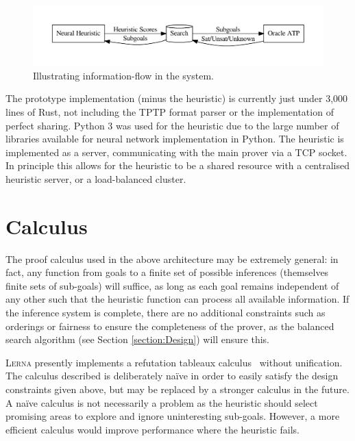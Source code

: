 \documentclass{llncs}
\newcommand{\lerna}{\textsc{Lerna}}
\begin{document}
\begin{figure}[t]
	\centering
	\includegraphics[width=0.8\linewidth]{architecture}
	\caption{Illustrating information-flow in the system.}
	\label{figure:architecture}
\end{figure}


The prototype implementation (minus the heuristic) %
is currently just under 3,000 lines of Rust, not including the TPTP format parser or the implementation of perfect sharing.
Python 3 was used for the heuristic due to the large number of libraries available for neural network implementation in Python.
The heuristic is implemented as a server, communicating with the main prover via a TCP socket.
In principle this allows for the heuristic to be a shared resource with a centralised heuristic server, or a load-balanced cluster.

\section{Calculus}
\label{section:Calculus}
The proof calculus used in the above architecture may be extremely general: in fact, any function from goals to a finite set of possible inferences (themselves finite sets of sub-goals) will suffice, as long as each goal remains independent of any other such that the heuristic function can process all available information.  If the inference system is complete, there are no additional constraints such as orderings or fairness to ensure the completeness of the prover, as the balanced search algorithm (see Section \ref{section:Design}) will ensure this.

\lerna{} presently implements a refutation tableaux calculus~\cite{handbook-of-automated-reasoning} without unification.
The calculus described is deliberately na\"ive in order to easily satisfy the design constraints given above, but may be replaced by a stronger calculus in the future. 
A na\"ive calculus is not necessarily a problem as the heuristic should select promising areas to explore and ignore uninteresting sub-goals.
However, a more efficient calculus would improve performance where the heuristic fails.
\end{document}
